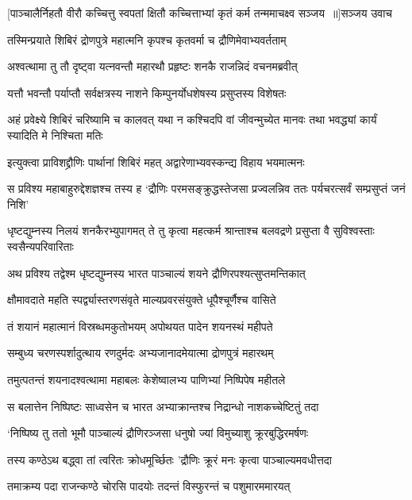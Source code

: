 \threelineshloka
{[पाञ्चालैर्निहतौ वीरौ कच्चित्तु स्वपतां क्षितौ}
{कच्चित्ताभ्यां कृतं कर्म तन्ममाचक्ष्व सञ्जय ॥]सञ्जय उवाच}
{}


\twolineshloka
{तस्मिन्प्रयाते शिबिरं द्रोणपुत्रे महात्मनि}
{कृपश्च कृतवर्मा च द्रौणिमेवाभ्यवर्तताम्}


\twolineshloka
{अश्वत्थामा तु तौ दृष्ट्वा यत्नवन्तौ महारथौ}
{प्रहृष्टः शनकै राजन्निदं वचनमब्रवीत्}


\twolineshloka
{यत्तौ भवन्तौ पर्याप्तौ सर्वक्षत्रस्य नाशने}
{किम्पुनर्योधशेषस्य प्रसुप्तस्य विशेषतः}


\threelineshloka
{अहं प्रवेक्ष्ये शिबिरं चरिष्यामि च कालवत्}
{यथा न कश्चिदपि वां जीवन्मुच्येत मानवः}
{तथा भवद्ध्यां कार्यं स्यादिति मे निश्चिता मतिः}


\twolineshloka
{इत्युक्त्वा प्राविशद्द्रौणिः पार्थानां शिबिरं महत्}
{अद्वारेणाभ्यवस्कन्द्य विहाय भयमात्मनः}


\threelineshloka
{स प्रविश्य महाबाहुरुद्देशज्ञश्च तस्य ह}
{`द्रौणिः परमसङ्क्रुद्धस्तेजसा प्रज्वलन्निव}
{ततः पर्यचरत्सर्वं सम्प्रसुप्तं जनं निशि'}


धृष्टद्युम्नस्य निलयं शनकैरभ्युपागमत्
\twolineshloka
{ते तु कृत्वा महत्कर्म श्रान्ताश्च बलवद्रणे}
{प्रसुप्ता वै सुविश्वस्ताः स्वसैन्यपरिवारिताः}


\twolineshloka
{अथ प्रविश्य तद्वेश्म धृष्टद्युम्नस्य भारत}
{पाञ्चाल्यं शयने द्रौणिरपश्यत्सुप्तमन्तिकात्}


\twolineshloka
{क्षौमावदाते महति स्पर्द्व्यास्तरणसंवृते}
{माल्यप्रवरसंयुक्ते धूपैश्चूर्णैश्च वासिते}


\twolineshloka
{तं शयानं महात्मानं विस्रब्धमकुतोभयम्}
{अपोथयत पादेन शयनस्थं महीपते}


\twolineshloka
{सम्बुध्य चरणस्पर्शादुत्थाय रणदुर्मदः}
{अभ्यजानादमेयात्मा द्रोणपुत्रं महारथम्}


\twolineshloka
{तमुत्पतन्तं शयनादश्वत्थामा महाबलः}
{केशेष्वालभ्य पाणिभ्यां निष्पिपेष महीतले}


\twolineshloka
{स बलात्तेन निष्पिष्टः साध्वसेन च भारत}
{अभ्याक्रान्तश्च निद्रान्धो नाशकच्चेष्टितुं तदा}


\twolineshloka
{`निष्पिष्य तु ततो भूमौ पाञ्चाल्यं द्रौणिरञ्जसा}
{धनुषो ज्यां विमुच्याशु क्रूरबुद्धिरमर्षणः}


\twolineshloka
{तस्य कण्ठेऽथ बद्ध्वा तां त्वरितः क्रोधमूर्च्छितः}
{'द्रौणिः क्रूरं मनः कृत्वा पाञ्चाल्यमवधीत्तदा}


\twolineshloka
{तमाक्रम्य पदा राजन्कण्ठे चोरसि पादयोः}
{तदन्तं विस्फुरन्तं च पशुमारममारयत्}


